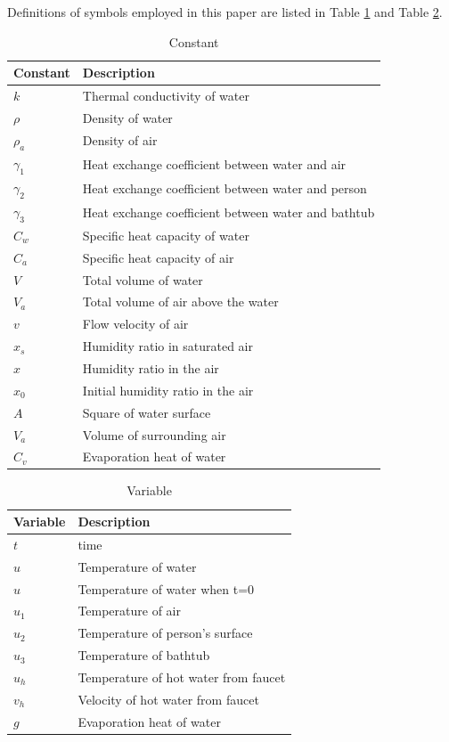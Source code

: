 \documentclass[12pt,a4paper,titlepage]{article}
\begin{document}
Definitions of symbols employed in this paper are listed in Table \ref{1_t} and Table \ref{2_t}.
\begin{table}
\begin{tabular}{l|l}
  Constant & Description \\
  \hline
  $k$            &Thermal conductivity of water \\
  $\rho$         &Density of water \\
  ${\rho}_a$     &Density of air \\
  ${\gamma}_1$   &Heat exchange coefficient between water and air \\
  ${\gamma}_2$   &Heat exchange coefficient between water and person \\
  ${\gamma}_3$   &Heat exchange coefficient between water and bathtub \\
  $C_w$          &Specific heat capacity of water \\
  $C_a$          &Specific heat capacity of air \\
  $V$            &Total volume of water \\
  $V_a$          &Total volume of air above the water \\
  $v$            &Flow velocity of air\\
  $x_s$          &Humidity ratio in saturated air \\
  $x$            &Humidity ratio in the air \\
  $x_0$          &Initial humidity ratio in the air \\
  $A$            &Square of water surface \\
  $V_a$          &Volume of surrounding air \\
  $C_v$          &Evaporation heat of water \\
\end{tabular}
\caption{Constant}\label{1_t}
\end{table}


\begin{table}
\begin{tabular}{l|l}
  Variable & Description \\
  \hline
  $t$            &time \\
  $u$            &Temperature of water \\
  $u$            &Temperature of water when t=0 \\
  $u_1$          &Temperature of air \\
  $u_2$          &Temperature of person's surface \\
  $u_3$          &Temperature of bathtub \\
  $u_h$          &Temperature of hot water from faucet \\
  $v_h$          &Velocity of hot water from faucet \\
  $g$            &Evaporation heat of water\\
\end{tabular}
\caption{Variable}\label{2_t}
\end{table}
\end{document}
